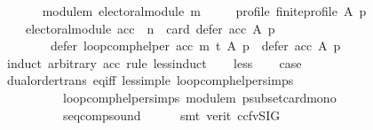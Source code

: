 \begin{isabellebody}
\ \ \isanewline
\ \ \ \ module{\isacharunderscore}{\kern0pt}m{\isacharcolon}{\kern0pt}\ {\isachardoublequoteopen}electoral{\isacharunderscore}{\kern0pt}module\ m{\isachardoublequoteclose}\ \isanewline
\ \ \ \ profile{\isacharcolon}{\kern0pt}\ {\isachardoublequoteopen}finite{\isacharunderscore}{\kern0pt}profile\ A\ p{\isachardoublequoteclose}\isanewline
\ \ \isanewline
\ \ \ \ {\isachardoublequoteopen}{\isacharparenleft}{\kern0pt}electoral{\isacharunderscore}{\kern0pt}module\ acc\ {\isasymand}\ n\ {\isacharequal}{\kern0pt}\ card\ {\isacharparenleft}{\kern0pt}defer\ acc\ A\ p{\isacharparenright}{\kern0pt}{\isacharparenright}{\kern0pt}\ {\isasymLongrightarrow}\isanewline
\ \ \ \ \ \ \ \ defer\ {\isacharparenleft}{\kern0pt}loop{\isacharunderscore}{\kern0pt}comp{\isacharunderscore}{\kern0pt}helper\ acc\ m\ t{\isacharparenright}{\kern0pt}\ A\ p\ {\isasymsubseteq}\ defer\ acc\ A\ p{\isachardoublequoteclose}\isanewline
%
\isadelimproof
%
\endisadelimproof
%
\isatagproof
{}\isamarkupfalse%
\ {\isacharparenleft}{\kern0pt}induct\ arbitrary{\isacharcolon}{\kern0pt}\ acc\ rule{\isacharcolon}{\kern0pt}\ less{\isacharunderscore}{\kern0pt}induct{\isacharparenright}{\kern0pt}\isanewline
\ \ \isamarkupfalse%
\ {\isacharparenleft}{\kern0pt}less{\isacharparenright}{\kern0pt}\isanewline
\ \ \isamarkupfalse%
\ {\isacharquery}{\kern0pt}case\isanewline
\ \ \ \ \isamarkupfalse%
\ dual{\isacharunderscore}{\kern0pt}order{\isachardot}{\kern0pt}trans\ eq{\isacharunderscore}{\kern0pt}iff\ less{\isacharunderscore}{\kern0pt}imp{\isacharunderscore}{\kern0pt}le\ loop{\isacharunderscore}{\kern0pt}comp{\isacharunderscore}{\kern0pt}helper{\isachardot}{\kern0pt}simps{\isacharparenleft}{\kern0pt}{}{\isacharparenright}{\kern0pt}\isanewline
\ \ \ \ \ \ \ \ \ \ loop{\isacharunderscore}{\kern0pt}comp{\isacharunderscore}{\kern0pt}helper{\isachardot}{\kern0pt}simps{\isacharparenleft}{\kern0pt}{}{\isacharparenright}{\kern0pt}\ module{\isacharunderscore}{\kern0pt}m\ psubset{\isacharunderscore}{\kern0pt}card{\isacharunderscore}{\kern0pt}mono\isanewline
\ \ \ \ \ \ \ \ \ \ seq{\isacharunderscore}{\kern0pt}comp{\isacharunderscore}{\kern0pt}sound\isanewline
\ \ \ \ \isamarkupfalse%
\ {\isacharparenleft}{\kern0pt}smt\ {\isacharparenleft}{\kern0pt}verit{\isacharcomma}{\kern0pt}\ ccfv{\isacharunderscore}{\kern0pt}SIG{\isacharparenright}{\kern0pt}{\isacharparenright}{\kern0pt}\isanewline
{}\isamarkupfalse%
%
\endisatagproof
{\isafoldproof}%
%
\isadelimproof
%
\endisadelimproof
%
\isadelimdocument
%
\endisadelimdocument
%
\isatagdocument
%
\isamarkuptrue%
%
\endisatagdocument
{\isafolddocument}%
%
\isadelimdocument
%
\endisadelimdocument
%
\isadelimtheory
%
\endisadelimtheory
%
\isatagtheory
{}\isamarkupfalse%
%
\endisatagtheory
{\isafoldtheory}%
%
\isadelimtheory
%
\endisadelimtheory
%
\end{isabellebody}%
